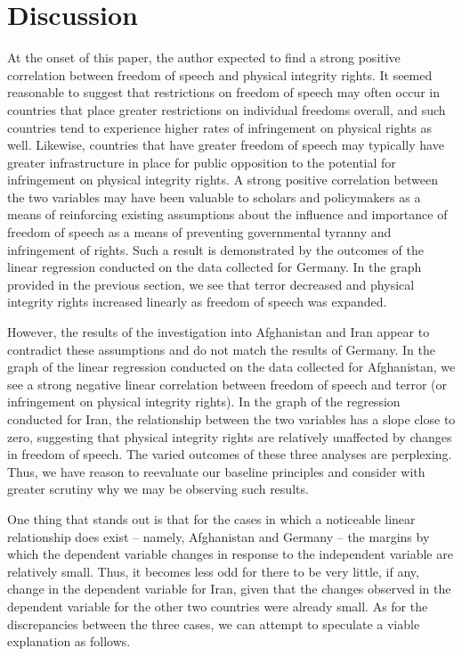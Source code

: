\documentclass{article}
\begin{document}
\section{Discussion}
At the onset of this paper, the author expected to find a strong positive correlation between freedom of speech and physical integrity rights. It seemed reasonable to suggest that restrictions on freedom of speech may often occur in countries that place greater restrictions on individual freedoms overall, and such countries tend to experience higher rates of infringement on physical rights as well. Likewise, countries that have greater freedom of speech may typically have greater infrastructure in place for public opposition to the potential for infringement on physical integrity rights. A strong positive correlation between the two variables may have been valuable to scholars and policymakers as a means of reinforcing existing assumptions about the influence and importance of freedom of speech as a means of preventing governmental tyranny and infringement of rights. Such a result is demonstrated by the outcomes of the linear regression conducted on the data collected for Germany. In the graph provided in the previous section, we see that terror decreased and physical integrity rights increased linearly as freedom of speech was expanded. 

However, the results of the investigation into Afghanistan and Iran appear to contradict these assumptions and do not match the results of Germany. In the graph of the linear regression conducted on the data collected for Afghanistan, we see a strong negative linear correlation between freedom of speech and terror (or infringement on physical integrity rights). In the graph of the regression conducted for Iran, the relationship between the two variables has a slope close to zero, suggesting that physical integrity rights are relatively unaffected by changes in freedom of speech. The varied outcomes of these three analyses are perplexing. Thus, we have reason to reevaluate our baseline principles and consider with greater scrutiny why we may be observing such results.

One thing that stands out is that for the cases in which a noticeable linear relationship does exist – namely, Afghanistan and Germany – the margins by which the dependent variable changes in response to the independent variable are relatively small. Thus, it becomes less odd for there to be very little, if any, change in the dependent variable for Iran, given that the changes observed in the dependent variable for the other two countries were already small. As for the discrepancies between the three cases, we can attempt to speculate a viable explanation as follows.
\end{document}
